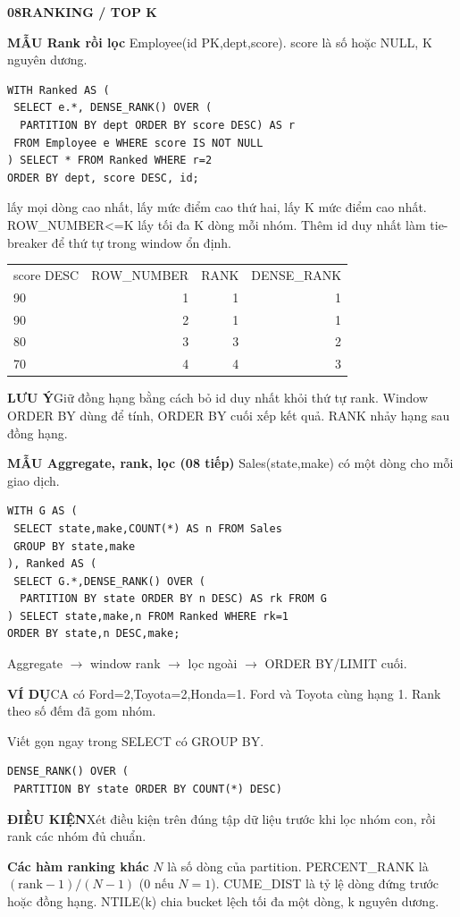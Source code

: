 \documentclass[a4paper]{article}
\newcommand{\sqlfont}{\ttfamily}
\newcommand{\bodyfontsize}{5.55}
\newcommand{\bodyleading}{5.2}
\newlength{\gutter}\setlength{\gutter}{1.5mm}
\newcommand{\bodylineskiplimit}{-2pt}
\newcommand{\bodystyle}{%
  \fontsize{\bodyfontsize}{\bodyleading}\selectfont\setlength{\lineskiplimit}{\bodylineskiplimit}\RaggedRight
  \setlength{\abovedisplayskip}{.5pt}\setlength{\belowdisplayskip}{.5pt}%
  \setlength{\abovedisplayshortskip}{.3pt}\setlength{\belowdisplayshortskip}{.3pt}}
\newcommand{\topic}[2]{\par\addvspace{.45pt}\nointerlineskip%
  \begingroup\setlength{\fboxsep}{0.35pt}%
  \noindent\colorbox{structure}{\parbox{\dimexpr\linewidth-2\fboxsep\relax}{%
    \color{white}\fontsize{6.45}{6.8}\selectfont\bfseries #1\enspace #2}}%
  \endgroup\par\nobreak\vspace{.55pt}\nointerlineskip\nobreak}
\newenvironment{topicblock}
  {\par\bodystyle}
  {\par}
\newcommand{\key}[1]{\par\textcolor{structure}{\textbf{#1}}\enspace}
\newcommand{\note}[4]{\par\nointerlineskip\vspace{.25pt}\begingroup\setlength{\fboxsep}{0.1pt}%
  \noindent\colorbox{#1}{\parbox{\dimexpr\linewidth-2\fboxsep\relax}{%
    \RaggedRight\textcolor{#2}{\textbf{#3}}\enspace #4}}%
  \endgroup\par\nointerlineskip\vspace{.25pt}}
\newcommand{\cond}[1]{\note{conditionbg}{condition}{ĐIỀU KIỆN}{#1}}
\newcommand{\trap}[1]{\note{warningbg}{warning}{LƯU Ý}{#1}}
\newcommand{\ex}[1]{\note{examplebg}{example}{VÍ DỤ}{#1}}
\newcommand{\pattern}[1]{\key{MẪU #1}}
\newcommand{\sql}[1]{{\sqlfont\color{sqltext}\detokenize{#1}}}
\newlength{\sheetwidth}
\newenvironment{sheetcolumns}[1]
  {\noindent\begin{minipage}[t]{#1\sheetwidth}\vspace{0pt}\bodystyle\ignorespaces}
  {\end{minipage}\par}
\newcommand{\nextcol}[1]{\end{minipage}\hspace{\gutter}%
  \begin{minipage}[t]{#1\sheetwidth}\vspace{0pt}\bodystyle\ignorespaces}
\begin{document}
\begin{sheetcolumns}{.258}
\begin{topicblock}
\topic{08}{RANKING / TOP K}
\pattern{Rank rồi lọc} Employee(id PK,dept,score). score là số hoặc NULL, K nguyên dương.
\begin{lstlisting}
WITH Ranked AS (
 SELECT e.*, DENSE_RANK() OVER (
  PARTITION BY dept ORDER BY score DESC) AS r
 FROM Employee e WHERE score IS NOT NULL
) SELECT * FROM Ranked WHERE r=2
ORDER BY dept, score DESC, id;
\end{lstlisting}
\sql{r=1} lấy mọi dòng cao nhất, \sql{r=2} lấy mức điểm cao thứ hai, \sql{r<=K} lấy K mức điểm cao nhất. ROW\_NUMBER<=K lấy tối đa K dòng mỗi nhóm. Thêm id duy nhất làm tie-breaker để thứ tự trong window ổn định.
\par{\centering\begin{tabular}{@{}lrrr@{}}
score DESC & ROW\_NUMBER & RANK & DENSE\_RANK\\
90 & 1 & 1 & 1\\90 & 2 & 1 & 1\\80 & 3 & 3 & 2\\70 & 4 & 4 & 3
\end{tabular}\par}
\trap{Giữ đồng hạng bằng cách bỏ id duy nhất khỏi thứ tự rank. Window ORDER BY dùng để tính, ORDER BY cuối xếp kết quả. RANK nhảy hạng sau đồng hạng.}
\end{topicblock}


\nextcol{.232}
\begin{topicblock}
\pattern{Aggregate, rank, lọc (08 tiếp)}
Sales(state,make) có một dòng cho mỗi giao dịch.
\begin{lstlisting}
WITH G AS (
 SELECT state,make,COUNT(*) AS n FROM Sales
 GROUP BY state,make
), Ranked AS (
 SELECT G.*,DENSE_RANK() OVER (
  PARTITION BY state ORDER BY n DESC) AS rk FROM G
) SELECT state,make,n FROM Ranked WHERE rk=1
ORDER BY state,n DESC,make;
\end{lstlisting}
Aggregate $\to$ window rank $\to$ lọc ngoài $\to$ ORDER BY/LIMIT cuối.
\ex{CA có Ford=2,Toyota=2,Honda=1. Ford và Toyota cùng hạng 1. Rank theo số đếm đã gom nhóm.}
Viết gọn ngay trong SELECT có GROUP BY.
\begin{lstlisting}
DENSE_RANK() OVER (
 PARTITION BY state ORDER BY COUNT(*) DESC)
\end{lstlisting}
\cond{Xét điều kiện trên đúng tập dữ liệu trước khi lọc nhóm con, rồi rank các nhóm đủ chuẩn.}
\key{Các hàm ranking khác}
$N$ là số dòng của partition. PERCENT\_RANK là $(\mathrm{rank}-1)/(N-1)$ (0 nếu $N=1$). CUME\_DIST là tỷ lệ dòng đứng trước hoặc đồng hạng. NTILE(k) chia bucket lệch tối đa một dòng, k nguyên dương.
\end{topicblock}


\end{sheetcolumns}
\end{document}
